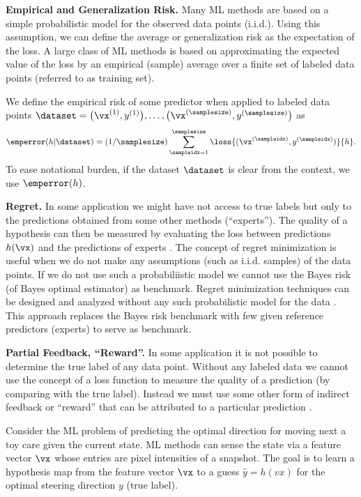 \documentclass[12pt]{report}
\begin{document}
{\bf Empirical and Generalization Risk.} 
Many ML methods are based on a simple probabilistic model for the 
observed data points (i.i.d.). Using this assumption, we can define the 
average or generalization risk as the expectation of the loss. A large class 
of ML methods is based on approximating the expected value of the loss 
by an empirical (sample) average over a finite set of labeled data points 
(referred to as training set). 

We define the empirical risk of some predictor when applied to labeled data points $\dataset=\big(\vx^{(1)},y^{(1)}\big),\ldots,\big(\vx^{(\samplesize)},y^{(\samplesize)}\big)$ 
as 
\begin{equation} 
\label{eq_def_emp_error_101}
\emperror(h|\dataset) = (1/\samplesize)\sum_{\sampleidx=1}^{\samplesize} \loss{(\vx^{(\sampleidx)},y^{(\sampleidx)})}{h}.  
\end{equation} 
To ease notational burden, if the dataset $\dataset$ is clear from the context, 
we use $\emperror(h)$. 




{\bf Regret.} In some application we might have not access to true labels 
but only to the predictions obtained from some other methods (``experts''). 
The quality of a hypothesis can then be measured by evaluating the loss 
between predictions $h(\vx)$ and the predictions of experts \cite{HazanOCO}. 
The concept of regret minimization is useful when we do not make any 
assumptions (such as i.i.d. samples) of the data points. If we do not use 
such a probabiliistic model we cannot use the Bayes risk (of Bayes optimal 
estimator) as benchmark. Regret minimization 
techniques can be designed and analyzed without any such probabilistic 
model for the data \cite{PredictionLearningGames}. This approach replaces 
the Bayes risk benchmark with few given reference predictors (experts) to 
serve as benchmark. 

{\bf Partial Feedback, ``Reward''.}  
In some application it is not possible to determine the true label of 
any data point. Without any labeled data we cannot use the concept 
of a loss function to measure the quality of a prediction (by comparing 
with the true label). Instead we must use some other form of indirect 
feedback or ``reward'' that can be attributed to a particular prediction \cite{PredictionLearningGames,SuttonEd2}. 

Consider the ML problem of predicting the optimal direction for 
moving next a toy care given the current state. ML methods can sense the 
state via a feature vector $\vx$ whose entries are pixel intensities of a 
snapshot. The goal is to learn a hypothesis map from the feature vector 
$\vx$ to a guess $\hat{y} = h(vx)$ for the optimal steering direction $y$ (true label). 
\end{document}
